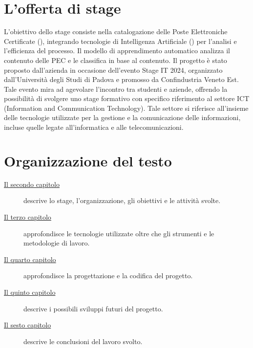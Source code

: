 \section{L'offerta di stage}
L'obiettivo dello stage consiste nella catalogazione delle Poste Elettroniche Certificate (), integrando tecnologie di Intelligenza Artificiale () per l'analisi e l'efficienza del processo. 
\newline
Il modello di apprendimento automatico analizza il contenuto delle PEC e le classifica in base al contenuto. 
\newline
Il progetto è stato proposto dall'azienda in occasione dell'evento Stage IT 2024, organizzato dall'Università degli Studi di Padova e promosso da Confindustria Veneto Est. Tale evento mira ad agevolare l'incontro tra studenti e aziende, offrendo la possibilità di svolgere uno stage formativo con specifico riferimento al settore ICT (Information and Communication Technology). Tale settore si riferisce all'insieme delle tecnologie utilizzate per la gestione e la comunicazione delle informazioni, incluse quelle legate all'informatica e alle telecomunicazioni.

\section{Organizzazione del testo}

\begin{description}
    \item[{\hyperref[cap:descrizione-stage]{Il secondo capitolo}}] descrive lo stage, l'organizzazione, gli obiettivi e le attività svolte.
    
    \item[{\hyperref[cap:tecnologie]{Il terzo capitolo}}] approfondisce le tecnologie utilizzate oltre che gli strumenti e le metodologie di lavoro.
    
    \item[{\hyperref[cap:progettazione-codifica]{Il quarto capitolo}}] approfondisce la progettazione e la codifica del progetto.
    
    \item[{\hyperref[cap:sviluppi-futuri]{Il quinto capitolo}}] descrive i possibili sviluppi futuri del progetto.
    
    \item[{\hyperref[cap:conclusioni]{Il sesto capitolo}}] descrive le conclusioni del lavoro svolto.
\end{description}
